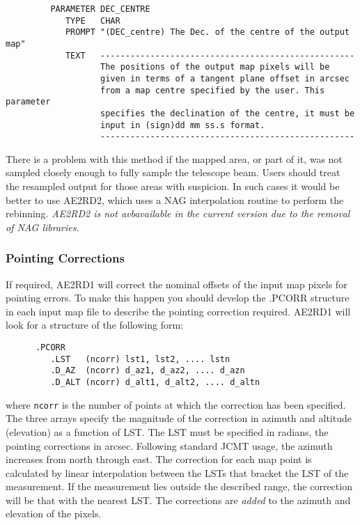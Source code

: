 \documentclass[twoside,11pt]{article}
\renewcommand{\_}{\texttt{\symbol{95}}}
\begin{document}
\begin{small}
\begin{verbatim}
         PARAMETER DEC_CENTRE
            TYPE   CHAR
            PROMPT "(DEC_centre) The Dec. of the centre of the output map"
            TEXT   ---------------------------------------------------
                   The positions of the output map pixels will be
                   given in terms of a tangent plane offset in arcsec
                   from a map centre specified by the user. This parameter
                   specifies the declination of the centre, it must be
                   input in (sign)dd mm ss.s format.
                   ---------------------------------------------------
\end{verbatim}
\end{small}

\goodbreak

There is a problem with this method if the mapped area, or part of it,
was not sampled closely enough to fully sample the telescope beam.
Users should treat the resampled output for those  areas with
suspicion. In such cases it would be better to use AE2RD2, which uses
a NAG interpolation routine to perform the rebinning. \textit{AE2RD2 is not
  avbavailable in the current version due to the removal of NAG libraries.}


\goodbreak

\subsubsection {Pointing Corrections}

If required, AE2RD1 will correct the nominal offsets of the  input map
pixels for pointing errors. To make this happen you should develop
the .PCORR structure in each input map file to describe the pointing
correction required. AE2RD1 will look for a structure of the following form:

\begin{small}
\begin{verbatim}
      .PCORR
         .LST   (ncorr) lst1, lst2, .... lstn
         .D_AZ  (ncorr) d_az1, d_az2, .... d_azn
         .D_ALT (ncorr) d_alt1, d_alt2, .... d_altn
\end{verbatim}
\end{small}

where \verb+ncorr+ is the number of points at which the correction has
been specified. The three arrays specify the magnitude of the correction
in azimuth and altitude (elevation) as a function of LST. The LST must be
specified in radians, the pointing corrections in arcsec. Following standard
JCMT usage, the azimuth increases from north through east. The
correction for each map point is calculated by linear interpolation
between the LSTs that bracket the LST of the measurement. If the
measurement lies outside the described  range, the correction will be
that with the nearest LST. The corrections are {\em added} to the azimuth
and elevation of the pixels.
\end{document}
